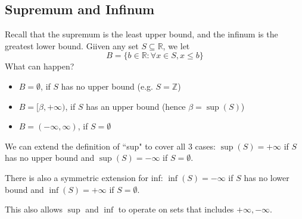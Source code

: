 \documentclass{article}
\theoremstyle{plain}
\theoremstyle{remark}
\newcommand{\Z}{{\mathbb Z}}
\newcommand{\R}{{\mathbb R}}
\begin{document}
\subsection{Supremum and Infinum}
Recall that the supremum is the least upper bound,
and the infinum is the greatest lower bound.
Giiven any set $S \subseteq \R$, we let
\[
	B = \{b \in \R \colon \forall x \in S, x \leq b\}
\]
What can happen?
\begin{itemize}
	\item $B = \emptyset$, if $S$ has no upper bound (e.g. $S = \Z$)
	\item $B = [\beta, +\infty)$, if $S$ has an upper bound (hence $\beta = \sup(S)$)
	\item $B = (-\infty,\infty)$, if $S = \emptyset$
\end{itemize}
We can extend the definition of ``sup" to cover all $3$ cases:
$\sup(S) = +\infty$ if $S$ has no upper bound and $\sup(S) = -\infty$ if $S = \emptyset$.

There is also a symmetric extension for inf:
$\inf(S) = -\infty$ if $S$ has no lower bound
and $\inf(S) = +\infty$ if $S = \emptyset$.

This also allows $\sup$ and $\inf$ to operate on sets that
includes $+\infty,-\infty$.
\end{document}

